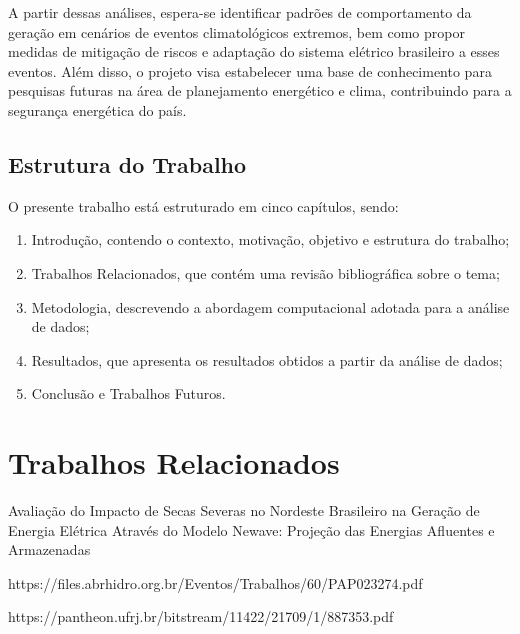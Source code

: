 A partir dessas análises, espera-se identificar padrões de comportamento da geração em cenários de eventos 
climatológicos extremos, bem como propor medidas de mitigação de riscos e adaptação do sistema elétrico brasileiro a 
esses eventos. Além disso, o projeto visa estabelecer uma base de conhecimento para pesquisas futuras na área de
planejamento energético e clima, contribuindo para a segurança energética do país.

\section{Estrutura do Trabalho}

O presente trabalho está estruturado em cinco capítulos, sendo:
\begin{enumerate}
	\item Introdução, contendo o contexto, motivação, objetivo e estrutura do trabalho;
	\item Trabalhos Relacionados, que contém uma revisão bibliográfica sobre o tema;
	\item Metodologia, descrevendo a abordagem computacional adotada para a análise de dados;
	\item Resultados, que apresenta os resultados obtidos a partir da análise de dados;
	\item Conclusão e Trabalhos Futuros.
\end{enumerate}

\chapter{Trabalhos Relacionados}
Avaliação do Impacto de Secas Severas no Nordeste Brasileiro na Geração de Energia Elétrica Através do Modelo Newave: 
Projeção das Energias Afluentes e Armazenadas \cite{Vilar2020}

{https://files.abrhidro.org.br/Eventos/Trabalhos/60/PAP023274.pdf}

{https://pantheon.ufrj.br/bitstream/11422/21709/1/887353.pdf}